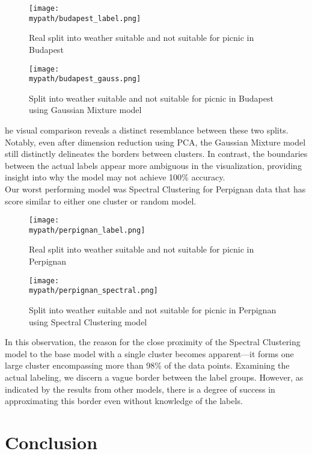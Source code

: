 \documentclass[a4paper]{article}
\begin{document}
	\begin{figure}[h!]
		\centerline{\texttt{[image: \\mypath/budapest\_label.png]}}
		\caption{Real split into weather suitable and not suitable for picnic in Budapest}
	\end{figure}
	
	\begin{figure}[h!]
		\centerline{\texttt{[image: \\mypath/budapest\_gauss.png]}}
		\caption{Split into weather suitable and not suitable for picnic in Budapest using Gaussian Mixture model}
	\end{figure}

	he visual comparison reveals a distinct resemblance between these two splits. Notably, even after dimension reduction using PCA, the Gaussian Mixture model still distinctly delineates the borders between clusters. In contrast, the boundaries between the actual labels appear more ambiguous in the visualization, providing insight into why the model may not achieve 100\% accuracy.
	\\
	\newpage
	Our worst performing model was Spectral Clustering for Perpignan data that has score similar to either one cluster or random model.
	
	\begin{figure}[h!]
		\centerline{\texttt{[image: \\mypath/perpignan\_label.png]}}
		\caption{Real split into weather suitable and not suitable for picnic in Perpignan}
	\end{figure}
	
	\begin{figure}[h!]
		\centerline{\texttt{[image: \\mypath/perpignan\_spectral.png]}}
		\caption{Split into weather suitable and not suitable for picnic in Perpignan using Spectral Clustering model}
	\end{figure}
	
	In this observation, the reason for the close proximity of the Spectral Clustering model to the base model with a single cluster becomes apparent—it forms one large cluster encompassing more than 98\% of the data points. Examining the actual labeling, we discern a vague border between the label groups. However, as indicated by the results from other models, there is a degree of success in approximating this border even without knowledge of the labels.
	
	\newpage
	
	\section{Conclusion}
	
\end{document}
